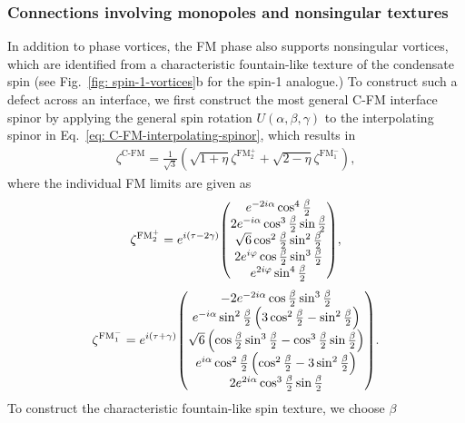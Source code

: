 \subsubsection{Connections involving monopoles and nonsingular textures}
In addition to phase vortices, the FM phase also supports nonsingular vortices,
which are identified from a characteristic fountain-like texture of
the condensate spin (see Fig.~\ref{fig: spin-1-vortices}b for the spin-1
analogue.)
To construct such a defect across an interface, we first construct the most
general C-FM interface spinor by applying the general spin rotation
\(U(\alpha, \beta, \gamma)\) to the interpolating spinor in
Eq.~\eqref{eq: C-FM-interpolating-spinor}, which results in
\begin{align}\label{eq: C-FM-coreless-general}
    \zeta^\text{C-FM} = \frac{1}{\sqrt{3}}\left(
        \sqrt{1 + \eta}\zeta^{\text{FM}_2^+}
        + \sqrt{2 - \eta}\zeta^{\text{FM}_1^-}
    \right),
\end{align}
where the individual FM limits are given as
\begin{align}\label{eq: FM-2-coreless}
    \zeta^{\text{FM}_2^+} =e^{i(\tau-2\gamma)}
    \mqty(
    e^{-2i\alpha}\cos^4\frac{\beta}{2} \\
    2e^{-i\alpha}\cos^3\frac{\beta}{2}\sin\frac{\beta}{2}  \\
    \sqrt{6}\cos^2\frac{\beta}{2}\sin^2\frac{\beta}{2} \\
    2e^{i\varphi}\cos\frac{\beta}{2}\sin^3\frac{\beta}{2} \\
    e^{2i\varphi}\sin^4\frac{\beta}{2}
    ),
\end{align}
\begin{align}\label{eq: FM-1-coreless}
    \zeta^{\text{FM}_1^-} = e^{i(\tau + \gamma)}
    \mqty(
    -2e^{-2i\alpha}\cos\frac{\beta}{2}\sin^3\frac{\beta}{2} \\
    e^{-i\alpha}\sin^2\frac{\beta}{2}\left(
        3\cos^2\frac{\beta}{2} -\sin^2\frac{\beta}{2}
    \right) \\
    \sqrt{6}\left(
        \cos\frac{\beta}{2}\sin^3\frac{\beta}{2}
        - \cos^3\frac{\beta}{2}\sin\frac{\beta}{2}
    \right) \\
    e^{i\alpha}\cos^2\frac{\beta}{2}\left(
        \cos^2\frac{\beta}{2}-3\sin^2\frac{\beta}{2}
    \right) \\
    2e^{2i\alpha}\cos^3\frac{\beta}{2}\sin\frac{\beta}{2}
    ).
\end{align}
To construct the characteristic fountain-like spin texture, we choose \(\beta\)
